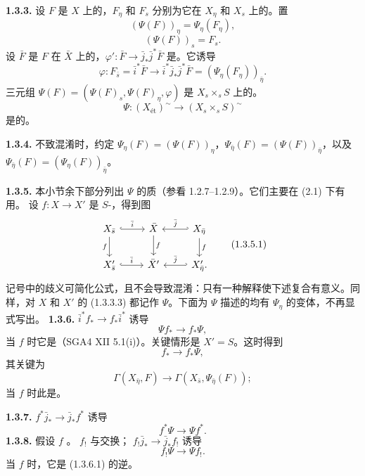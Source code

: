 \textbf{1.3.3.} 设 $F$ 是 $X$ 上的，$F_\eta$ 和 $F_s$ 分别为它在 $X_\eta$ 和 $X_s$ 上的。置
\[(\Psi(F))_\eta=\Psi_\eta(F_\eta),\tag{1.3.3.1}\]
\[(\Psi(F))_s=F_s.\tag{1.3.3.2}\]
设 $\bar F$ 是 $F$ 在 $\bar X$ 上的，$\varphi':\bar F\to\bar j_*\bar j^*\bar F$ 是。它诱导
\[\varphi:F_{\bar s}=\bar i^*\bar F\longrightarrow\bar i^*\bar j_*\bar j^*\bar F=(\Psi_\eta(F_\eta))_{\bar\eta}.\]
三元组 $\Psi(F)=(\Psi(F)_s,\Psi(F)_\eta,\varphi)$ 是 $X_s\times_sS$ 上的。
\[\Psi:(X_{\text{ét}})^\sim\longrightarrow(X_s\times_sS)^\sim\tag{1.3.3.3}\]
是的。

\textbf{1.3.4.} 不致混淆时，约定 $\Psi_\eta(F)=(\Psi(F))_\eta$，$\Psi_{\bar\eta}(F)=(\Psi(F))_{\bar\eta}$，以及 $\Psi_{\bar\eta}(F)=(\Psi_\eta(F))_{\bar\eta}$。

\textbf{1.3.5.} 本小节余下部分列出 $\Psi$ 的质（参看 1.2.7--1.2.9）。它们主要在 (2.1) 下有用。
设 $f:X\to X'$ 是 $S$-，得到图
\[
\begin{tikzcd}
X_{\bar s}\arrow[r,hook,"\bar i"]\arrow[d,"f"']&\bar X\arrow[d,"f"]&X_{\bar\eta}\arrow[l,hook',"\bar j"']\arrow[d,"f"]\\
X'_{\bar s}\arrow[r,hook,"\bar i"]&\bar X'&X'_{\bar\eta}\arrow[l,hook',"\bar j"'].
\end{tikzcd}\tag{1.3.5.1}
\]
记号中的歧义可简化公式，且不会导致混淆：只有一种解释使下述复合有意义。同样，对 $X$ 和 $X'$ 的 (1.3.3.3) 都记作 $\Psi$。下面为 $\Psi$ 描述的均有 $\Psi_\eta$ 的变体，不再显式写出。
\textbf{1.3.6.}  $\bar i^*f_*\to f_*\bar i^*$ 诱导
\[\Psi f_*\longrightarrow f_*\Psi,\tag{1.3.6.1}\]
当 $f$ 时它是（SGA4 XII 5.1(i)）。关键情形是 $X'=S$。这时得到
\[f_*\longrightarrow f_*\Psi,\tag{1.3.6.2}\]
其关键为
\[\Gamma(X_{\bar\eta},F)\longrightarrow\Gamma(X_{\bar s},\Psi_{\bar\eta}(F));\tag{1.3.6.3}\]
当 $f$ 时此是。

\textbf{1.3.7.}  $f^*\bar j_*\to\bar j_*f^*$ 诱导
\[f^*\Psi\longrightarrow\Psi f^*.\tag{1.3.7.1}\]
\textbf{1.3.8.} 假设 $f$ 。 $f_!$ 与交换； $f_!\bar j_*\to\bar j_*f_!$ 诱导
\[f_!\Psi\longrightarrow\Psi f_!.\tag{1.3.8.1}\]
当 $f$ 时，它是 (1.3.6.1) 的逆。

